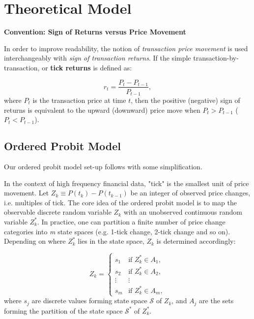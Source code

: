 \chapter{Theoretical Model}\label{chap:model}


{\noindent\bfseries Convention: Sign of Returns versus Price Movement}

In order to improve readability, the notion of \textit{transaction price movement} is used interchangeably with \textit{sign of transaction returns}. If the simple transaction-by-transaction, or \textbf{tick returns} is defined as:

\begin{equation}
    r_t = \frac{P_t - P_{t-1}}{P_{t-1}} ,
    \label{eq:1}
\end{equation}
where $P_t$ is the transaction price at time $t$, then the positive (negative) sign of returns is equivalent to the upward (downward) price move when \(P_t > P_{t-1}\) (\(P_t < P_{t-1}\)).

\section{Ordered Probit Model}

Our ordered probit model set-up follows \citet{hausman1992} with some simplification. 

In the context of high frequency financial data, "tick" is the smallest unit of price movement. Let $Z_k \equiv P(t_k) - P(t_{k-1})$ be an integer of observed price changes, i.e. multiples of tick. The core idea of the ordered probit model is to map the observable discrete random variable $Z_k$ with an unobserved continuous random variable $Z^*_k$. In practice, one can partition a finite number of price change categories into \textit{m} state spaces (e.g. 1-tick change, 2-tick change and so on). Depending on where $Z^*_k$ lies in the state space, $Z_k$ is determined accordingly:

\begin{equation}
Z_k =
\begin{cases}
s_1 & \text{if } Z_k^* \in A_1, \\
s_2 & \text{if } Z_k^* \in A_2, \\
\vdots & \vdots \\
s_m & \text{if } Z_k^* \in A_m,
\end{cases}
    \label{eq:2}
\end{equation}
where $s_j$ are discrete values forming state space \(\mathscr{S}\) of $Z_k$, and $A_j$ are the sets forming the partition of the state space \(\mathscr{S^*}\) of $Z^*_k$. 

